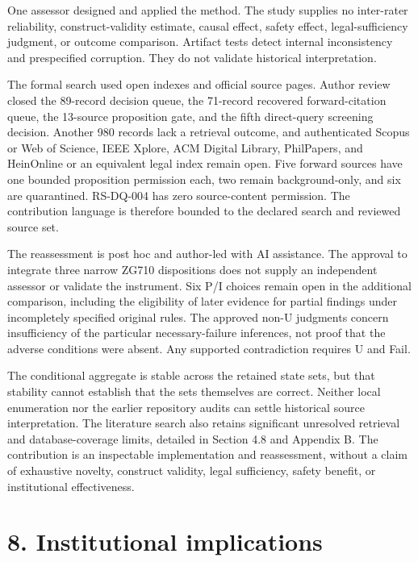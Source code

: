 \documentclass[11pt]{article}
\begin{document}
One assessor designed and applied the method. The study supplies no inter-rater reliability, construct-validity estimate, causal effect, safety effect, legal-sufficiency judgment, or outcome comparison. Artifact tests detect internal inconsistency and prespecified corruption. They do not validate historical interpretation.

The formal search used open indexes and official source pages. Author review closed the 89-record decision queue, the 71-record recovered forward-citation queue, the 13-source proposition gate, and the fifth direct-query screening decision. Another 980 records lack a retrieval outcome, and authenticated Scopus or Web of Science, IEEE Xplore, ACM Digital Library, PhilPapers, and HeinOnline or an equivalent legal index remain open. Five forward sources have one bounded proposition permission each, two remain background-only, and six are quarantined. RS-DQ-004 has zero source-content permission. The contribution language is therefore bounded to the declared search and reviewed source set.

The reassessment is post hoc and author-led with AI assistance. The approval to integrate three narrow ZG710 dispositions does not supply an independent assessor or validate the instrument. Six P/I choices remain open in the additional comparison, including the eligibility of later evidence for partial findings under incompletely specified original rules. The approved non-U judgments concern insufficiency of the particular necessary-failure inferences, not proof that the adverse conditions were absent. Any supported contradiction requires U and Fail.

The conditional aggregate is stable across the retained state sets, but that stability cannot establish that the sets themselves are correct. Neither local enumeration nor the earlier repository audits can settle historical source interpretation. The literature search also retains significant unresolved retrieval and database-coverage limits, detailed in Section 4.8 and Appendix B. The contribution is an inspectable implementation and reassessment, without a claim of exhaustive novelty, construct validity, legal sufficiency, safety benefit, or institutional effectiveness.

\section*{8. Institutional implications}
\end{document}
